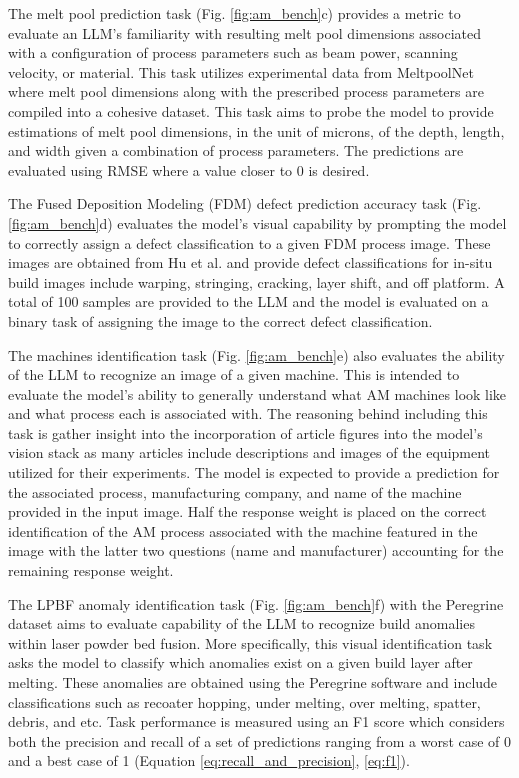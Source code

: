 The melt pool prediction task (Fig. \ref{fig:am_bench}c) provides a metric to
evaluate an LLM's familiarity with resulting melt pool dimensions associated
with a configuration of process parameters such as beam power, scanning
velocity, or material. This task utilizes experimental data from MeltpoolNet
\cite{akbari_meltpoolnet_2022} where melt pool dimensions along with the
prescribed process parameters are compiled into a cohesive dataset. This task
aims to probe the model to provide estimations of melt pool dimensions, in the
unit of microns, of the depth, length, and width given a combination of process
parameters. The predictions are evaluated using RMSE where a value closer to 0
is desired.

The Fused Deposition Modeling (FDM) defect prediction accuracy task (Fig.
\ref{fig:am_bench}d) evaluates the model's visual capability by prompting the
model to correctly assign a defect classification to a given FDM process image.
These images are obtained from Hu et al. \cite{hu_real-time_2024} and provide
defect classifications for in-situ build images include warping, stringing,
cracking, layer shift, and off platform. A total of 100 samples are provided to
the LLM and the model is evaluated on a binary task of assigning the image to
the correct defect classification.

The machines identification task (Fig. \ref{fig:am_bench}e) also evaluates the
ability of the LLM to recognize an image of a given machine. This is intended to
evaluate the model's ability to generally understand what AM machines look like
and what process each is associated with. The reasoning behind including this
task is gather insight into the incorporation of article figures into the
model's vision stack as many articles include descriptions and images of the
equipment utilized for their experiments. The model is expected to provide a
prediction for the associated process, manufacturing company, and name of the
machine provided in the input image. Half the response weight is placed on the
correct identification of the AM process associated with the machine featured in
the image with the latter two questions (name and manufacturer) accounting for
the remaining response weight.

The LPBF anomaly identification task (Fig. \ref{fig:am_bench}f) with the
Peregrine dataset \cite{scime_layer-wise_2023} aims to evaluate capability of
the LLM to recognize build anomalies within laser powder bed fusion. More
specifically, this visual identification task asks the model to classify which
anomalies exist on a given build layer after melting. These anomalies are
obtained using the Peregrine software and include classifications such as
recoater hopping, under melting, over melting, spatter, debris, and etc. Task
performance is measured using an F1 score which considers both the precision and
recall of a set of predictions ranging from a worst case of 0 and a best case of
1 (Equation \ref{eq:recall_and_precision}, \ref{eq:f1}).

